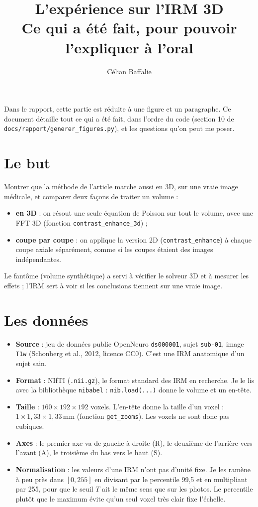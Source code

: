 \documentclass[11pt,a4paper]{article}
\title{L'expérience sur l'IRM 3D\\[0.2em]\large Ce qui a été fait, pour pouvoir l'expliquer à l'oral}
\author{Célian Baffalie}
\date{}
\begin{document}
\maketitle

Dans le rapport, cette partie est réduite à une figure et un paragraphe. Ce document détaille tout ce qui a
été fait, dans l'ordre du code (section 10 de \texttt{docs/rapport/generer\_figures.py}), et les questions
qu'on peut me poser.

\section{Le but}

Montrer que la méthode de l'article marche aussi en 3D, sur une vraie image médicale, et comparer deux
façons de traiter un volume :
\begin{itemize}
  \item \textbf{en 3D} : on résout une seule équation de Poisson sur tout le volume, avec une FFT 3D
  (fonction \texttt{contrast\_enhance\_3d}) ;
  \item \textbf{coupe par coupe} : on applique la version 2D (\texttt{contrast\_enhance}) à chaque coupe
  axiale séparément, comme si les coupes étaient des images indépendantes.
\end{itemize}
Le fantôme (volume synthétique) a servi à vérifier le solveur 3D et à mesurer les effets ; l'IRM sert à
voir si les conclusions tiennent sur une vraie image.

\section{Les données}

\begin{itemize}
  \item \textbf{Source} : jeu de données public OpenNeuro \texttt{ds000001}, sujet \texttt{sub-01},
  image \texttt{T1w} (Schonberg et al., 2012, licence CC0). C'est une IRM anatomique d'un sujet sain.
  \item \textbf{Format} : NIfTI (\texttt{.nii.gz}), le format standard des IRM en recherche. Je le lis
  avec la bibliothèque \texttt{nibabel} : \texttt{nib.load(...)} donne le volume et un en-tête.
  \item \textbf{Taille} : $160\times192\times192$ voxels. L'en-tête donne la taille d'un voxel :
  $1\times1{,}33\times1{,}33$\,mm (fonction \texttt{get\_zooms}). Les voxels ne sont donc pas cubiques.
  \item \textbf{Axes} : le premier axe va de gauche à droite (R), le deuxième de l'arrière vers l'avant
  (A), le troisième du bas vers le haut (S).
  \item \textbf{Normalisation} : les valeurs d'une IRM n'ont pas d'unité fixe. Je les ramène à peu près
  dans $[0,255]$ en divisant par le percentile 99,5 et en multipliant par 255, pour que le seuil $T$ ait
  le même sens que sur les photos. Le percentile plutôt que le maximum évite qu'un seul voxel très clair
  fixe l'échelle.
\end{itemize}
\end{document}
